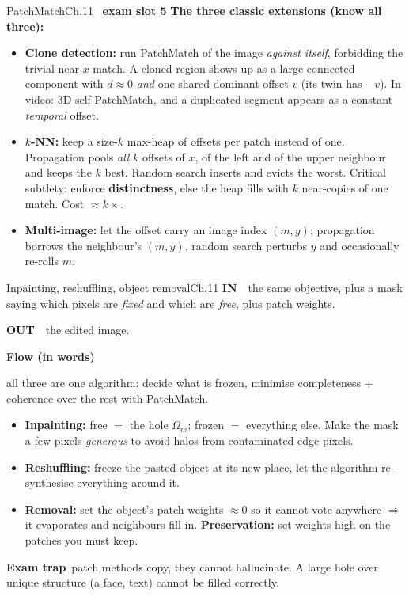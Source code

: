\documentclass[9pt,a4paper]{extarticle}
\newcommand{\IN}{\textbf{\color{cIn}IN}\ }
\newcommand{\OUT}{\par\textbf{\color{cOut}OUT}\ }
\newcommand{\FLOW}{\par\smallskip\textbf{Flow (in words)}\par\nopagebreak}
\newcommand{\TRAP}{\par\smallskip\textbf{\color{cTrap}Exam trap}\ }
\begin{document}
\begin{card}{PatchMatch}{Ch.11 \textbullet\ \textbf{exam slot 5}}
\smallskip
\textbf{The three classic extensions (know all three):}
\begin{itemize}
  \item \textbf{Clone detection:} run PatchMatch of the image \emph{against itself}, forbidding the trivial near-$x$ match. A cloned region shows up as a large connected component with $d\approx0$ \emph{and} one shared dominant offset $v$ (its twin has $-v$). In video: 3D self-PatchMatch, and a duplicated segment appears as a constant \emph{temporal} offset.
  \item \textbf{$k$-NN:} keep a size-$k$ max-heap of offsets per patch instead of one. Propagation pools \emph{all} $k$ offsets of $x$, of the left and of the upper neighbour and keeps the $k$ best. Random search inserts and evicts the worst. Critical subtlety: enforce \textbf{distinctness}, else the heap fills with $k$ near-copies of one match. Cost $\approx k\times$.
  \item \textbf{Multi-image:} let the offset carry an image index $(m,y)$; propagation borrows the neighbour's $(m,y)$, random search perturbs $y$ and occasionally re-rolls $m$.
\end{itemize}
\end{card}

\begin{card}{Inpainting, reshuffling, object removal}{Ch.11}
\IN\ the same objective, plus a mask saying which pixels are \emph{fixed} and which are \emph{free}, plus patch weights.
\OUT\ the edited image.

\FLOW all three are one algorithm: decide what is frozen, minimise completeness $+$ coherence over the rest with PatchMatch.
\begin{itemize}
  \item \textbf{Inpainting:} free $=$ the hole $\Omega_m$; frozen $=$ everything else. Make the mask a few pixels \emph{generous} to avoid halos from contaminated edge pixels.
  \item \textbf{Reshuffling:} freeze the pasted object at its new place, let the algorithm re-synthesise everything around it.
  \item \textbf{Removal:} set the object's patch weights $\approx0$ so it cannot vote anywhere $\Rightarrow$ it evaporates and neighbours fill in. \textbf{Preservation:} set weights high on the patches you must keep.
\end{itemize}
\TRAP patch methods copy, they cannot hallucinate. A large hole over unique structure (a face, text) cannot be filled correctly.
\end{card}
\end{document}
